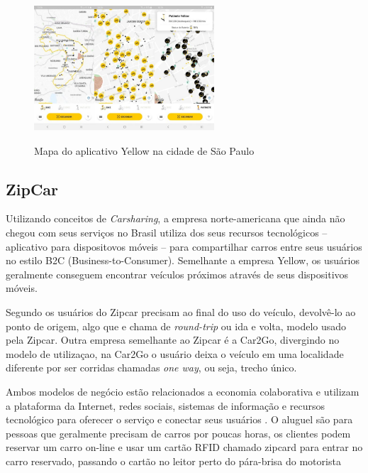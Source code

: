 \begin{figure}[!hbtp]
	\centering
	\caption{Mapa do aplicativo Yellow na cidade de São Paulo}
	\includegraphics[width=0.6\textwidth]{./04-figuras/yellow/yellow.png}
	\label{fig:yellow-app}
\end{figure}

\subsection{ZipCar}

Utilizando conceitos de \textit{Carsharing}, a empresa norte-americana que ainda não chegou com seus serviços no Brasil utiliza dos seus recursos tecnológicos -- aplicativo para dispositovos móveis -- para compartilhar carros entre seus usuários no estilo B2C (Business-to-Consumer). Semelhante a empresa Yellow, os usuários geralmente conseguem encontrar veículos próximos através de seus dispositivos móveis.

Segundo \cite{ballus-armet} os usuários do Zipcar precisam ao final do uso do veículo, devolvê-lo ao ponto de origem, algo que e chama de \textit{round-trip} ou ida e volta, modelo usado pela Zipcar. Outra empresa semelhante ao Zipcar é a Car2Go, divergindo no modelo de utilizaçao, na Car2Go o usuário deixa o veículo em uma localidade diferente por ser corridas chamadas \textit{one way}, ou seja, trecho único.

Ambos modelos de negócio estão relacionados a economia colaborativa e utilizam a plataforma da Internet, redes sociais, sistemas de informação e recursos tecnológico para oferecer o serviço e conectar seus usuários \cite{ballus-armet}. O aluguel são para pessoas que geralmente precisam de carros por poucas horas, %
os clientes podem reservar um carro on-line e usar um cartão RFID chamado zipcard para entrar no carro reservado, passando o cartão no leitor perto do pára-brisa do motorista \cite{pearlson2009strategic} %

